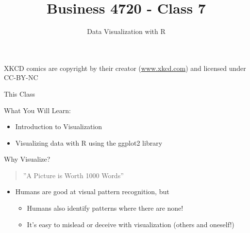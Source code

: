 \documentclass[ignorenonframetext,xcolor=x11names]{beamer}
\title{Business 4720 - Class 7}
\subtitle{Data Visualization with R}
\begin{document}
\begin{frame}[label=full]{}
  \titlepage
  \footnotesize 
   
  
XKCD comics are copyright by their creator (\url{www.xkcd.com}) and licensed under CC-BY-NC
\end{frame}

\begin{frame}[label=full]{This Class}

\begin{block}{What You Will Learn:}
\begin{itemize}
  \item Introduction to Visualization
  \item Visualizing data with R using the ggplot2 library
\end{itemize}
\end{block}
\end{frame}


\begin{frame}[label=full]{Why Visualize?}
  \begin{quote} \large \centering
    ''A Picture is Worth 1000 Words''
  \end{quote}
  
\begin{itemize}
  \item Humans are good at visual pattern recognition, but
  \begin{itemize}
    \item Humans also identify patterns where there are none!
    \item It's easy to mislead or deceive with visualization (others and oneself!)
  \end{itemize}
\end{itemize}
\end{frame}
\end{document}
